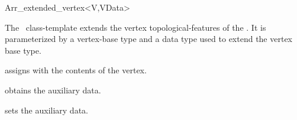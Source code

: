 
\ccRefPageBegin

\begin{ccRefClass}{Arr_extended_vertex<V,VData>}

\ccDefinition
  The \ccRefName\ class-template extends the vertex
  topological-features of the \dcel. It is parameterized by a
  vertex-base type  and a data type  used to extend
  the vertex base type.


\ccIsModel

\ccInheritsFrom

\ccCreation
{}
  {assigns \ccVar{} with the contents of the  vertex.}

\ccAccessFunctions
  {obtains the auxiliary data.}

\ccModifiers
  {sets the auxiliary data.}

\ccSeeAlso

\end{ccRefClass}

\ccRefPageEnd
